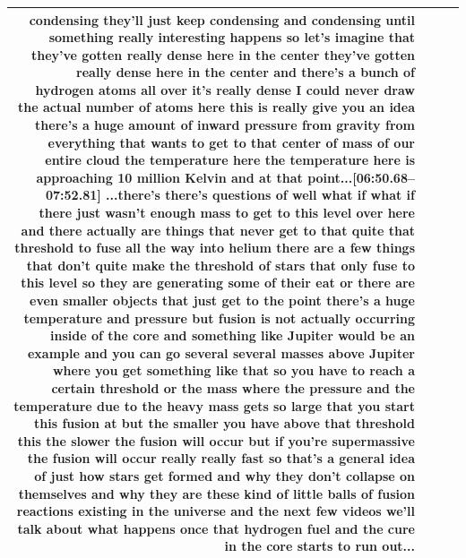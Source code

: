 \documentclass[10pt]{article}
\begin{document}
\begin{tiny}
\begin{longtable}{|r|p{0.375in}|p{1.275in}|p{3.5in}|}
condensing they'll just keep condensing and condensing until something really interesting happens so let's imagine that they've gotten really dense here in the center they've gotten really dense here in the center and there's a bunch of hydrogen atoms all over it's really dense I could never draw the actual number of atoms here this is really give you an idea there's a huge amount of inward pressure from gravity from everything that wants to get to that center of mass of our entire cloud the temperature here the temperature here is approaching 10 million Kelvin and at that point...\newline\textbf{[06:50.68--07:52.81]} ...there's there's questions of well what if what if there just wasn't enough mass to get to this level over here and there actually are things that never get to that quite that threshold to fuse all the way into helium there are a few things that don't quite make the threshold of stars that only fuse to this level so they are generating some of their eat or there are even smaller objects that just get to the point there's a huge temperature and pressure but fusion is not actually occurring inside of the core and something like Jupiter would be an example and you can go several several masses above Jupiter where you get something like that so you have to reach a certain threshold or the mass where the pressure and the temperature due to the heavy mass gets so large that you start this fusion at but the smaller you have above that threshold this the slower the fusion will occur but if you're supermassive the fusion will occur really really fast so that's a general idea of just how stars get formed and why they don't collapse on themselves and why they are these kind of little balls of fusion reactions existing in the universe and the next few videos we'll talk about what happens once that hydrogen fuel and the cure in the core starts to run out... \\\hline

\end{longtable}
\end{tiny}
\end{document}
